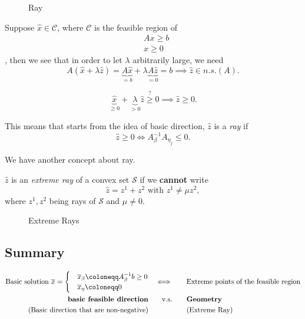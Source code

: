 \begin{figure}[H]
	\centering
	\caption{Ray}
	\label{fig:ray}
\end{figure}

Suppose \(\hat{x}\in\mathcal{C}\), where \(\mathcal{C}\) is the feasible region of
\begin{align*}
	 & Ax \geq  b \\
	 & x\geq 0
\end{align*},
then we see that in order to let \(\lambda\) arbitrarily large, we need
\[
	A(\hat{x} + \lambda \hat{z}) = \underbrace{A \hat{x}}_{=b} + \lambda \underbrace{A \hat{z}}_{=0} = b\implies \hat{z} \in n.s.(A).
\]

\begin{problem}
\[
	\underbrace{\hat{x}}_{\geq 0} + \underbrace{\lambda}_{>0} \hat{z} \overset{?}{\geq} 0 \implies \hat{z} \geq 0.
\]
\end{problem}

This means that starts from the idea of basic direction, \(\hat{z}\) is a \emph{ray} if
\[
	\hat{z} \geq 0 \iff A^{-1}_{\beta}A_{\eta_j} \leq 0.
\]

We have another concept about ray.
\begin{definition}
	\(\hat{z}\) is an \emph{extreme ray} of a convex set \(\mathcal{S}\) if we \textbf{cannot} write
	\[
		\hat{z} = z^1 + z^2 \text{ with }z^1 \neq \mu z^2,
	\]
	where \(z^1, z^2\) being rays of \(\mathcal{S}\) and \(\mu\neq 0\).
\end{definition}
\begin{figure}[H]
	\centering
	\caption{Extreme Rays}
	\label{fig:extreme-ray}
\end{figure}

\subsection{Summary}
\[
	\begin{alignedat}{4}
		\text{Basic solution }\overline{x}=\begin{cases}
			 & \overline{x}_{\beta}\coloneqq A^{-1}_{\beta}b\geq 0 \\
			 & \overline{x}_{\eta}\coloneqq 0
		\end{cases} &&\quad\iff\qquad&\text{Extreme points of the feasible region}\\
		\text{\textbf{basic feasible direction}} && \quad\text{v.s.}\qquad&\text{\textbf{Geometry}}\\
		\text{(Basic direction that are non-negative)}&& &\text{(Extreme Ray)}
	\end{alignedat}
\]
